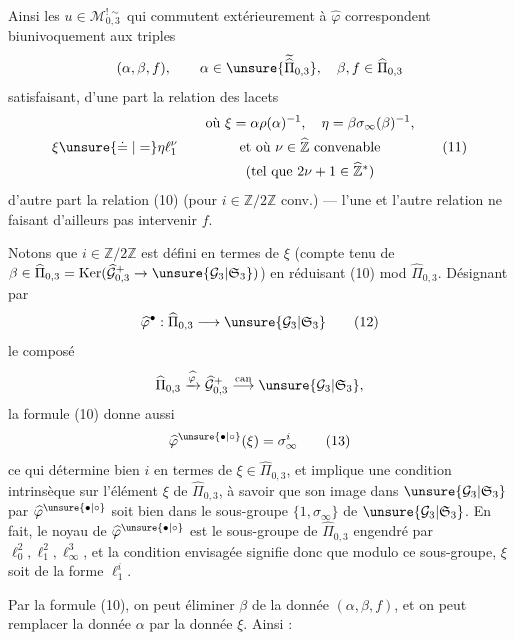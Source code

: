 Ainsi les $u\in\mathcal M_{0,3}^{!\sim}$ qui commutent
extérieurement à $\widehat\varphi$ correspondent biunivoquement aux
 triples 
\[
(\alpha,\beta,f),\qquad
\alpha\in\unsure{\widetilde{\widehat\Pi}_{0,3}},\quad
\beta,f\in\widehat\Pi_{0,3}
\]
satisfaisant, d'une part la relation des lacets
\[
\xi\unsure{\doteq|=}\eta\ell_1^\nu
\qquad
\begin{gathered}
\text{où }\xi=\alpha\rho(\alpha)^{-1},\quad
\eta=\beta\sigma_\infty(\beta)^{-1},\\
\text{et où }\nu\in\widehat{\mathbb Z}\ \text{convenable}\\
(\text{tel que }2\nu+1\in\widehat{\mathbb Z}^{*})
\end{gathered}
\tag{11}
\]
d'autre part la relation (10) (pour $i\in\mathbb Z/2\mathbb Z$ conv.)
--- l'une et l'autre relation ne faisant d'ailleurs pas intervenir $f$.


Notons que $i\in\mathbb Z/2\mathbb Z$ est défini en termes de
$\xi$ (compte tenu de
$\beta\in\widehat\Pi_{0,3}=\operatorname{Ker}
(\widehat{\mathcal G}_{0,3}^{+}\to\unsure{\mathcal G_3|\mathfrak S_3})$)
en réduisant (10) mod $\widehat\Pi_{0,3}$. Désignant par
\[
\widehat\varphi^{\bullet}:
\widehat\Pi_{0,3}\longrightarrow\unsure{\mathcal G_3|\mathfrak S_3}
\tag{12}
\]
le composé
\[
\widehat\Pi_{0,3}\xrightarrow{\widehat\varphi}
\widehat{\mathcal G}_{0,3}^{+}
\overset{\mathrm{can}}{\longrightarrow}
\unsure{\mathcal G_3|\mathfrak S_3},
\]
la formule (10) donne aussi
\[
\widehat\varphi^{\unsure{\bullet|\circ}}(\xi)=\sigma_\infty^i
\tag{13}
\]
ce qui détermine bien $i$ en termes de
$\xi\in\widehat\Pi_{0,3}$, et implique une condition intrinsèque sur
l'élément $\xi$ de $\widehat\Pi_{0,3}$, à savoir que son image dans
$\unsure{\mathcal G_3|\mathfrak S_3}$ par
$\widehat\varphi^{\unsure{\bullet|\circ}}$ soit bien dans le sous-groupe
$\{1,\sigma_\infty\}$ de $\unsure{\mathcal G_3|\mathfrak S_3}$.
En fait, le noyau de $\widehat\varphi^{\unsure{\bullet|\circ}}$ est
le sous-groupe  de $\widehat\Pi_{0,3}$ engendré par
$\ell_0^2,\ell_1^2,\ell_\infty^3$, et la condition envisagée signifie
donc que modulo ce sous-groupe, $\xi$ soit de la forme $\ell_1^i$.

Par la formule (10), on peut éliminer $\beta$ de la donnée
$(\alpha,\beta,f)$, et on peut remplacer la donnée $\alpha$ par la donnée
$\xi$. Ainsi :

